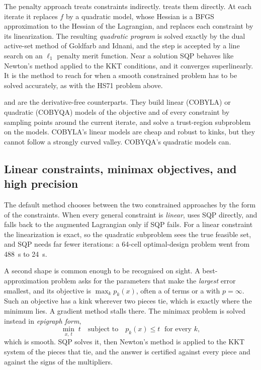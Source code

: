 The penalty approach treats constraints indirectly.  treats
them directly. At each iterate it replaces \(f\) by a quadratic model, whose
Hessian is a BFGS approximation to the Hessian of the Lagrangian, and
replaces each constraint by its linearization. The resulting \emph{quadratic
program} is solved exactly by the dual
active-set method of Goldfarb and Idnani, and the step is accepted by a line
search on an \(\ell_1\) penalty merit function. Near a solution SQP behaves
like Newton's method applied to the KKT conditions, and it converges
superlinearly. It is the method to reach for when a smooth constrained problem
has to be solved accurately, as with the HS71 problem above.

 and  are the derivative-free counterparts.
They build linear (COBYLA) or quadratic (COBYQA) models of the objective and
of every constraint by sampling points around the current iterate, and solve a
trust-region subproblem on the models. COBYLA's linear models are cheap and
robust to kinks, but they cannot follow a strongly curved valley. COBYQA's
quadratic models can.


\subsection{Linear constraints, minimax objectives, and high precision}
\label{ssec:opt-sqp-minimax}

The default method chooses between the two constrained approaches by the form of the
constraints. When every general constraint is \emph{linear},  uses SQP
directly, and falls back to the augmented Lagrangian only if SQP fails. For a linear
constraint the linearization is exact, so the quadratic subproblem sees the true
feasible set, and SQP needs far fewer iterations: a 64-cell optimal-design problem
went from 488~s to 24~s.

A second shape is common enough to be recognised on sight. A best-approximation
problem asks for the parameters that make the \emph{largest} error smallest, and its
objective is \(\max_k p_k(x)\), often a  of  terms or a  with
\(p = \infty\). Such an objective has a kink wherever two pieces tie, which is exactly
where the minimum lies. A gradient method stalls there. The minimax problem is solved instead in \emph{epigraph form},
\[
  \min_{x,\,t}\; t \quad \text{subject to} \quad p_k(x) \le t \;\text{ for every } k,
\]
which is smooth. SQP solves it, then Newton's method is applied to the KKT system of
the pieces that tie, and the answer is certified against every piece and against the
signs of the multipliers.

